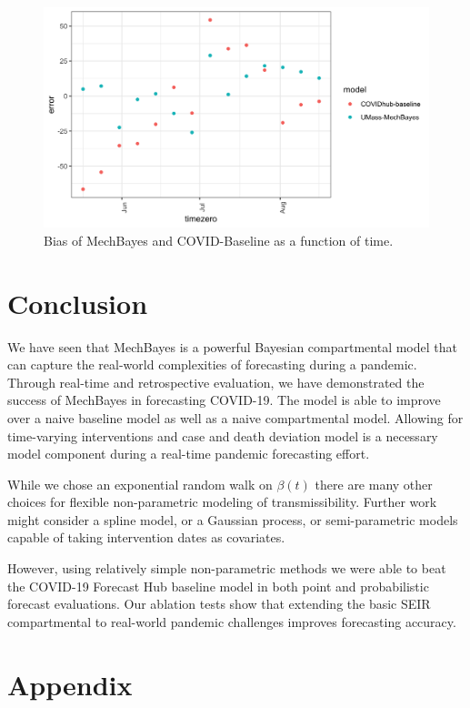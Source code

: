 \documentclass[11pt]{amsart}
\begin{document}
\begin{figure}
\centering
\includegraphics[scale=.15]{bias_by_timezero.png}
\caption{Bias of MechBayes and COVID-Baseline as a function of time.  }
\label{fig:results_discussion}
\end{figure}



\section{Conclusion}

We have seen that MechBayes is a powerful Bayesian compartmental model that can capture the real-world complexities of forecasting during a pandemic. Through real-time and retrospective evaluation, we have demonstrated the success of MechBayes in forecasting COVID-19. The model is able to improve over a naive baseline model as well as a naive compartmental model. Allowing for time-varying interventions and case and death deviation model is a necessary model component during a real-time pandemic forecasting effort. 

While we chose an exponential random walk on $\beta(t)$ there are many other choices for flexible non-parametric modeling of transmissibility. Further work might consider a spline model, or a Gaussian process, or semi-parametric models capable of taking intervention dates as covariates. 

However, using relatively simple non-parametric methods we were able to beat the COVID-19 Forecast Hub baseline model in both point and probabilistic forecast evaluations. Our ablation tests show that extending the basic SEIR compartmental to real-world pandemic challenges improves forecasting accuracy. 


\newpage

\section{Appendix}
\end{document}
